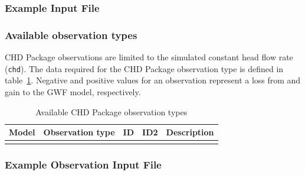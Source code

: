 \vspace{5mm}
\subsubsection{Example Input File}


\vspace{5mm}
\subsubsection{Available observation types}
CHD Package observations are limited to the simulated constant head flow rate (\texttt{chd}). The data required for the CHD Package observation type is defined in table~\ref{table:gwf-chdobstype}. Negative and positive values for an observation represent a loss from and gain to the GWF model, respectively.

\begin{longtable}{p{2cm} p{2.75cm} p{2cm} p{1.25cm} p{7cm}}
\caption{Available CHD Package observation types} \tabularnewline

\hline
\hline
\textbf{Model} & \textbf{Observation type} & \textbf{ID} & \textbf{ID2} & \textbf{Description} \\
\hline
\endhead

\hline
\endfoot


\label{table:gwf-chdobstype}
\end{longtable}

\vspace{5mm}
\subsubsection{Example Observation Input File}


